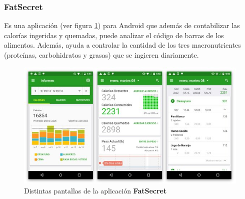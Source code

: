 \subsubsection{FatSecret}
Es una aplicación \cite{app_fat_secret} (ver figura \ref{fig:fatsecret_app}) para Android que además de contabilizar las calorías ingeridas y quemadas, puede analizar el código de barras de los alimentos. Además, ayuda a controlar la cantidad de los tres macronutrientes (proteínas, carbohidratos y grasas) que se ingieren diariamente.
\begin{figure}[H]
    \centering
    \includegraphics[width=\textwidth]{Images/Capitulo2/fatsecret.jpg}
    \caption{Distintas pantallas de la aplicación \textbf{FatSecret}}
    \label{fig:fatsecret_app}
\end{figure}


